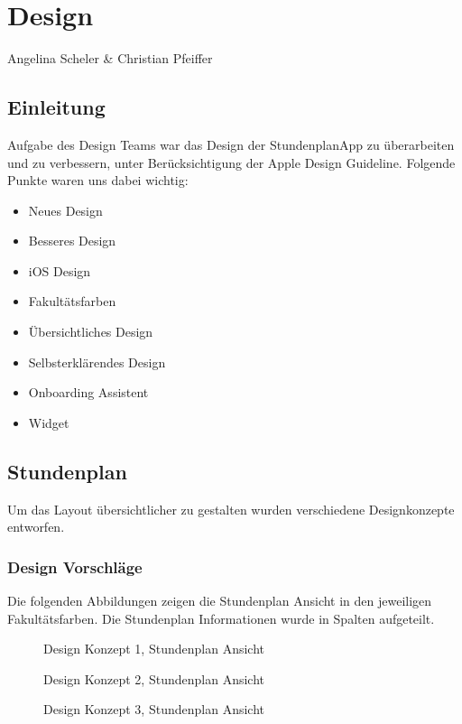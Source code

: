 \chapter{Design}
Angelina Scheler \& Christian Pfeiffer

\section{Einleitung}
Aufgabe des Design Teams war das Design der StundenplanApp zu überarbeiten und zu verbessern, unter Berücksichtigung der Apple Design Guideline. Folgende Punkte waren uns dabei wichtig:

\begin{itemize}
\item Neues Design
\item Besseres Design
\item iOS Design
\item Fakultätsfarben
\item Übersichtliches Design
\item Selbsterklärendes Design
\item Onboarding Assistent
\item Widget
\end{itemize}


\section{Stundenplan}
Um das Layout übersichtlicher zu gestalten wurden verschiedene Designkonzepte entworfen.
\subsection{Design Vorschläge}
Die folgenden Abbildungen zeigen die Stundenplan Ansicht in den jeweiligen Fakultätsfarben. Die Stundenplan Informationen wurde in Spalten aufgeteilt. 

\begin{figure}[H]
	\centering
	\caption{Design Konzept 1, Stundenplan Ansicht}
	\label{fig1}
\end{figure}

\begin{figure}[H]
	\centering
	\caption{Design  Konzept 2, Stundenplan Ansicht}
	\label{fig1}
\end{figure}

\begin{figure}[H]
	\centering
	\caption{Design Konzept 3,  Stundenplan Ansicht}
	\label{fig1}
\end{figure}

